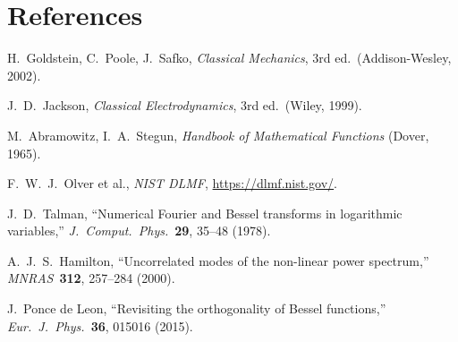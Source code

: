 \documentclass[11pt,a4paper]{article}
\begin{document}
\section*{References}

\begin{enumerate}[label={[\arabic*]},nosep]
\item H.~Goldstein, C.~Poole, J.~Safko, \emph{Classical Mechanics}, 3rd ed.\ (Addison-Wesley, 2002).
\item J.~D.~Jackson, \emph{Classical Electrodynamics}, 3rd ed.\ (Wiley, 1999).
\item M.~Abramowitz, I.~A.~Stegun, \emph{Handbook of Mathematical Functions} (Dover, 1965).
\item F.~W.~J.~Olver et al., \emph{NIST DLMF}, \url{https://dlmf.nist.gov/}.
\item J.~D.~Talman, ``Numerical Fourier and Bessel transforms in logarithmic variables,''
      \emph{J.\ Comput.\ Phys.}\ \textbf{29}, 35--48 (1978).
\item A.~J.~S.~Hamilton, ``Uncorrelated modes of the non-linear power spectrum,''
      \emph{MNRAS}\ \textbf{312}, 257--284 (2000).
\item J.~Ponce de Leon, ``Revisiting the orthogonality of Bessel functions,''
      \emph{Eur.\ J.\ Phys.}\ \textbf{36}, 015016 (2015).
\end{enumerate}
\end{document}
